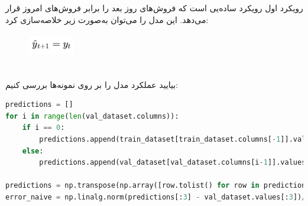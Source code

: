 \documentclass{article}
\begin{document}
\subsection*{}
رویکرد اول رویکرد ساده‌یی است که فروش‌های روز بعد را برابر فروش‌های امروز قرار می‌دهد. این مدل را می‌توان به‌صورت زیر خلاصه‌سازی کرد:
\begin{figure}[hbt!]
	\centering
	\includegraphics[width=2cm,height=1cm]{Outputs/e2.png}
\end{figure}
\ \\
بیایید ‌عملکرد مدل  را بر روی نمونه‌ها بررسی کنیم: 
\begin{latin}
\begin{lstlisting}[language=Python]
predictions = []
for i in range(len(val_dataset.columns)):
	if i == 0:
		predictions.append(train_dataset[train_dataset.columns[-1]].values)
	else:
		predictions.append(val_dataset[val_dataset.columns[i-1]].values)

predictions = np.transpose(np.array([row.tolist() for row in predictions]))
error_naive = np.linalg.norm(predictions[:3] - val_dataset.values[:3])/len(predictions[0])
\end{lstlisting}
\end{latin}
\end{document}
